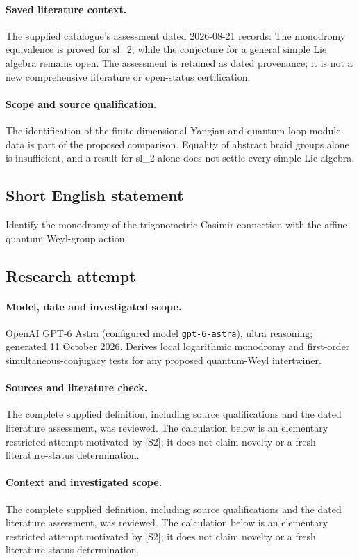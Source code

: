 \documentclass[11pt]{article}
\begin{document}
\paragraph{Saved literature context.} The supplied catalogue's assessment dated 2026-08-21 records: The monodromy equivalence is proved for sl\_2, while the conjecture for a general simple Lie algebra remains open. The assessment is retained as dated provenance; it is not a new comprehensive literature or open-status certification.
\paragraph{Scope and source qualification.}The identification of the finite-dimensional Yangian and quantum-loop module data is part of the proposed comparison. Equality of abstract braid groups alone is insufficient, and a result for sl_2 alone does not settle every simple Lie algebra.
\subsection{Short English statement}
Identify the monodromy of the trigonometric Casimir connection with the affine quantum Weyl-group action.
\subsection{Research attempt}
\paragraph{Model, date and investigated scope.}
OpenAI GPT-6 Astra (configured model \texttt{gpt-6-astra}), ultra reasoning; generated 11 October 2026. Derives local logarithmic monodromy and first-order simultaneous-conjugacy tests for any proposed quantum-Weyl intertwiner.

\paragraph{Sources and literature check.}
The complete supplied definition, including source qualifications and the dated literature assessment, was reviewed. The calculation below is an elementary restricted attempt motivated by [S2]; it does not claim novelty or a fresh literature-status determination.

\paragraph{Context and investigated scope.} The complete supplied definition, including source qualifications and the dated literature assessment, was reviewed. The calculation below is an elementary restricted attempt motivated by [S2]; it does not claim novelty or a fresh literature-status determination.
\end{document}
